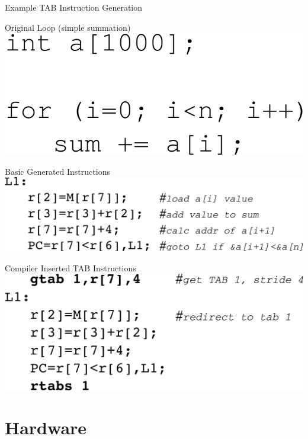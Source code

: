 \documentclass{beamer}
\begin{document}
\begin{frame}{Example TAB Instruction Generation}
   \begin{center}
      \begin{block}{Original Loop (simple summation)}
         \includegraphics[scale=0.20]{figures/compiler_example_1-1.pdf}
      \end{block}
      \begin{block}{Basic Generated Instructions}
         \includegraphics[scale=0.20]{figures/compiler_example_1-2.pdf}
      \end{block}
      \begin{block}{Compiler Inserted TAB Instructions}
         \includegraphics[scale=0.20]{figures/compiler_example_1-3.pdf}
      \end{block}
   \end{center}
\end{frame}
\section{Hardware}
\end{document}
